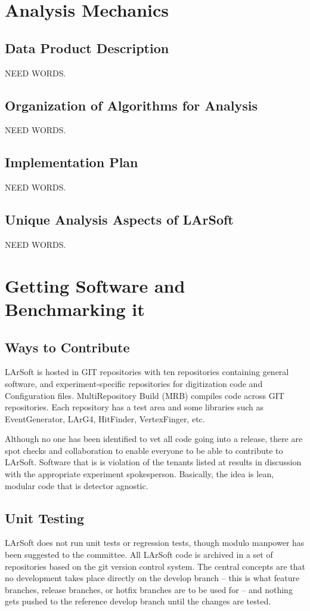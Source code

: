 \documentclass[12pt]{elsarticle}
\begin{document}
               
\section{Analysis Mechanics}

\subsection{Data Product Description}
NEED WORDS.

\subsection{Organization of Algorithms for Analysis}
NEED WORDS.

\subsection{Implementation Plan}
NEED WORDS.

\subsection{Unique Analysis Aspects of LArSoft}
NEED WORDS.

\section{Getting Software and Benchmarking it}
\subsection{Ways to Contribute}

LArSoft is hosted in GIT repositories with ten repositories containing general software, and experiment-specific repositories for digitization code and Configuration files. MultiRepository Build (MRB) compiles code across GIT repositories. Each repository has a test area and some libraries such as EventGenerator, LArG4, HitFinder, VertexFinger, etc.\cite{gian}

Although no one has been identified to vet all code going into a release, there are spot checks and collaboration to enable everyone to be able to contribute to LArSoft. Software that is is violation of the tenants listed at \cite{code tenants} results in discussion with the appropriate experiment spokesperson. Basically, the idea is lean, modular code that is detector agnostic.  

\subsection{Unit Testing}
LArSoft does not run unit tests or regression tests, though modulo manpower has been suggested to the committee.
All LArSoft code is archived in a set of repositories based on the git version control system.
The central concepts are that no development takes place directly on the develop branch -- this is what feature branches, release branches, or hotfix branches are to be used for -- and nothing gets pushed to the reference develop branch until the changes are tested.\cite{git-control}
\end{document}

